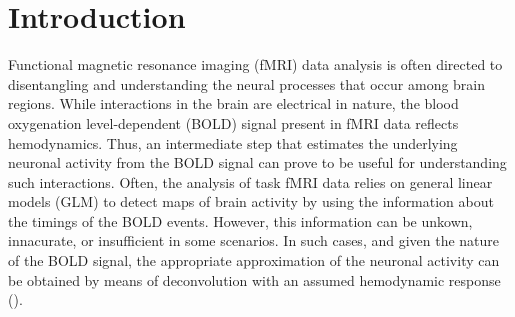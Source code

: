 \section{Introduction}








Functional magnetic resonance imaging (fMRI) data analysis is often directed to disentangling and understanding the neural processes that occur among brain regions. While interactions in the brain are electrical in nature, the blood oxygenation level-dependent (BOLD) signal present in fMRI data reflects hemodynamics. Thus, an intermediate step that estimates the underlying neuronal activity from the BOLD signal can prove to be useful for understanding such interactions. Often, the analysis of task fMRI data relies on general linear models (GLM) to detect maps of brain activity by using the information about the timings of the BOLD events. However, this information can be unkown, innacurate, or insufficient in some scenarios. In such cases, and given the nature of the BOLD signal, the appropriate approximation of the neuronal activity can be obtained by means of deconvolution with an assumed hemodynamic response (\citealt{gitelman2003ModelingRegionalPsychophysiologic}).

